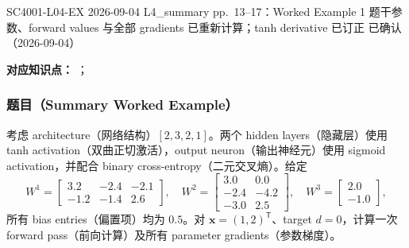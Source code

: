 

\examplemeta
  {SC4001-L04-EX}
  {2026-09-04}
  {L4\_summary pp.~13--17：Worked Example 1}
  {题干参数、forward values 与全部 gradients 已重新计算；tanh derivative 已订正}
  {已确认（2026-09-04）}


\textbf{对应知识点：}
；

\subsubsection*{题目（Summary Worked Example）}

考虑 architecture（网络结构）$[2,3,2,1]$。两个 hidden layers（隐藏层）使用 tanh activation（双曲正切激活），output neuron（输出神经元）使用 sigmoid activation，并配合 binary cross-entropy（二元交叉熵）。给定
\[
  W^1=\begin{bmatrix}
    3.2&-2.4&-2.1\\
    -1.2&-1.4&2.6
  \end{bmatrix},\quad
  W^2=\begin{bmatrix}
    3.0&0.0\\
    -2.4&-4.2\\
    -3.0&2.5
  \end{bmatrix},\quad
  W^3=\begin{bmatrix}2.0\\-1.0\end{bmatrix},
\]
所有 bias entries（偏置项）均为 $0.5$。对 $\bm x=(1,2)^{\mathsf T}$、target $d=0$，计算一次 forward pass（前向计算）及所有 parameter gradients（参数梯度）。

